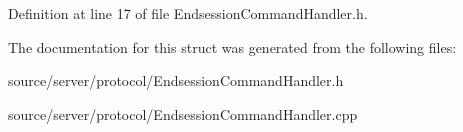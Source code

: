 Definition at line 17 of file Endsession\-Command\-Handler.\-h.



The documentation for this struct was generated from the following files\-:\begin{DoxyCompactItemize}
\item 
source/server/protocol/Endsession\-Command\-Handler.\-h\item 
source/server/protocol/Endsession\-Command\-Handler.\-cpp\end{DoxyCompactItemize}
